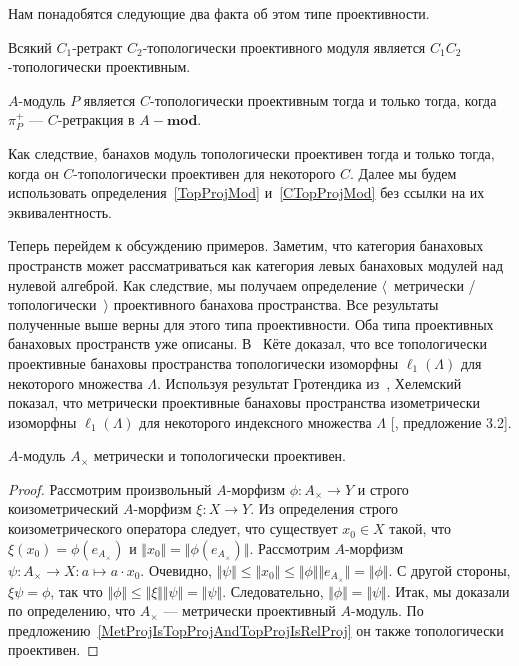 Нам понадобятся следующие два факта об этом типе проективности.

\begin{proposition}\label{RetrCTopProjIsCTopProj} Всякий $C_1$-ретракт $C_2$-топологически
проективного модуля является $C_1C_2$-топологически проективным.
\end{proposition}

\begin{proposition}\label{CTopProjModViaCanonicMorph} $A$-модуль $P$ является
$C$-топологически проективным тогда и только тогда, когда $\pi_P^+$ ---
$C$-ретракция в $A-\mathbf{mod}$.
\end{proposition}

Как следствие, банахов модуль топологически проективен тогда и только тогда,
когда он $C$-топологически проективен для некоторого $C$. Далее мы будем
использовать определения~\ref{TopProjMod} и~\ref{CTopProjMod} без ссылки на их
эквивалентность.

Теперь перейдем к обсуждению примеров. Заметим, что категория банаховых
пространств может рассматриваться как категория левых банаховых модулей над
нулевой алгеброй. Как следствие, мы получаем определение $\langle$~метрически /
топологически~$\rangle$ проективного банахова пространства. Все результаты
полученные выше верны для этого типа проективности. Оба типа проективных
банаховых пространств уже описаны. В~\cite{KotheTopProjBanSp} Кёте доказал, что
все топологически проективные банаховы пространства топологически изоморфны
$\ell_1(\Lambda)$ для некоторого множества $\Lambda$. Используя результат
Гротендика из~\cite{GrothMetrProjFlatBanSp}, Хелемский показал, что метрически
проективные банаховы пространства изометрически изоморфны $\ell_1(\Lambda)$ для
некоторого индексного множества $\Lambda$ [\cite{HelMetrFrQMod}, предложение
3.2].

\begin{proposition}\label{UnitalAlgIsMetTopProj} $A$-модуль $A_\times$
метрически и топологически проективен.
\end{proposition} 
\begin{proof} Рассмотрим произвольный $A$-морфизм $\phi:A_\times\to Y$ и строго
коизометрический $A$-морфизм $\xi:X\to Y$. Из определения строго
коизометрического оператора следует, что существует $x_0\in X$ такой, что
$\xi(x_0)=\phi(e_{A_\times})$ и $\Vert x_0\Vert=\Vert\phi(e_{A_\times})\Vert$.
Рассмотрим $A$-морфизм $\psi:A_\times\to X:a\mapsto a\cdot x_0$. Очевидно,
$\Vert\psi\Vert\leq\Vert x_0\Vert\leq\Vert\phi\Vert\Vert
e_{A_\times}\Vert=\Vert\phi\Vert$. С другой стороны, $\xi\psi=\phi$, так что
$\Vert\phi\Vert\leq\Vert\xi\Vert\Vert\psi\Vert=\Vert\psi\Vert$. Следовательно,
$\Vert\phi\Vert=\Vert\psi\Vert$. Итак, мы доказали по определению, что
$A_\times$ --- метрически проективный $A$-модуль. По
предложению~\ref{MetProjIsTopProjAndTopProjIsRelProj} он также топологически
проективен.
\end{proof}

